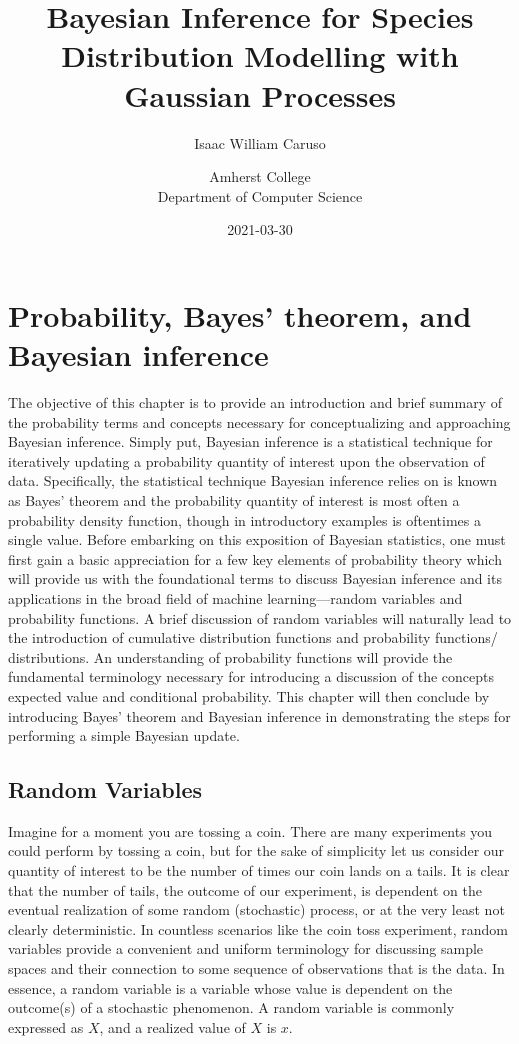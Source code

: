 \documentclass[
  12pt,
]{book}
\title{Bayesian Inference for Species Distribution Modelling with Gaussian Processes}
\subtitle{Isaac William Caruso}
\author{Amherst College\\
Department of Computer Science}
\date{2021-03-30}
\theoremstyle{definition}
\theoremstyle{definition}
\theoremstyle{definition}
\theoremstyle{remark}
\begin{document}
\maketitle

{
\setcounter{tocdepth}{1}
\tableofcontents
}
\hypertarget{probability-bayes-theorem-and-bayesian-inference}{%
\chapter{Probability, Bayes' theorem, and Bayesian inference}\label{probability-bayes-theorem-and-bayesian-inference}}

The objective of this chapter is to provide an introduction and brief summary of the probability terms and concepts necessary for conceptualizing and approaching Bayesian inference.
Simply put, Bayesian inference is a statistical technique for iteratively updating a probability quantity of interest upon the observation of data.
Specifically, the statistical technique Bayesian inference relies on is known as Bayes' theorem and the probability quantity of interest is most often a probability density function, though in introductory examples is oftentimes a single value.
Before embarking on this exposition of Bayesian statistics, one must first gain a basic appreciation for a few key elements of probability theory which will provide us with the foundational terms to discuss Bayesian inference and its applications in the broad field of machine learning---random variables and probability functions.
A brief discussion of random variables will naturally lead to the introduction of cumulative distribution functions and probability functions/ distributions.
An understanding of probability functions will provide the fundamental terminology necessary for introducing a discussion of the concepts expected value and conditional probability.
This chapter will then conclude by introducing Bayes' theorem and Bayesian inference in demonstrating the steps for performing a simple Bayesian update.

\hypertarget{random-variables}{%
\section{Random Variables}\label{random-variables}}

Imagine for a moment you are tossing a coin.
There are many experiments you could perform by tossing a coin, but for the sake of simplicity let us consider our quantity of interest to be the number of times our coin lands on a tails.
It is clear that the number of tails, the outcome of our experiment, is dependent on the eventual realization of some random (stochastic) process, or at the very least not clearly deterministic.
In countless scenarios like the coin toss experiment, random variables provide a convenient and uniform terminology for discussing sample spaces and their connection to some sequence of observations that is the data.
In essence, a random variable is a variable whose value is dependent on the outcome(s) of a stochastic phenomenon.
A random variable is commonly expressed as \(X\), and a realized value of \(X\) is \(x\).
\end{document}
